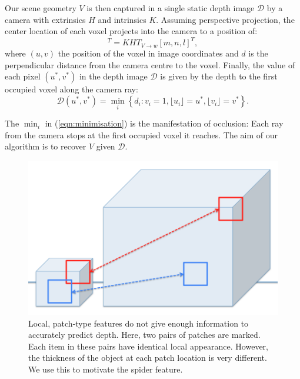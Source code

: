\documentclass[10pt,twocolumn,letterpaper]{article}
\newcommand{\rgbdimage}{\mathcal{D}}
\newcommand{\intrinsics}{K}
\newcommand{\voxelgrid}{V}
\newcommand{\voxidx}{i}
\newcommand{\voxelidxs}{m, n, l}
\newcommand{\trans}{T}
\newcommand{\extrinsics}{H}
\newcommand{\voxelgridtoworld}{\trans_{\voxelgrid \rightarrow w}}
\begin{document}
Our scene geometry $\voxelgrid$ is then captured in a single static depth image $\rgbdimage$ by a camera with extrinsics $\extrinsics$ and intrinsics $\intrinsics$. 
Assuming perspective projection, the center location of each voxel projects into the camera to a position of:
\begin{equation}
[u, v, d]^T = \intrinsics \extrinsics \voxelgridtoworld [\voxelidxs]^T,
\end{equation}
where $(u,v)$ the position of the voxel in image coordinates and $d$ is the  perpendicular distance from the camera centre to the voxel.
Finally, the value of each pixel $(u^*, v^*)$ in the depth image $\rgbdimage$ is given by the depth to the first occupied voxel along the camera ray:
\begin{equation}
\rgbdimage(u^*,v^*) = \min_\voxidx \left\{ d_{\voxidx} : v_{\voxidx} = 1, \lfloor u_{\voxidx} \rfloor = u^*, \lfloor v_{\voxidx} \rfloor = v^* \right\}.
\label{eqn:minimisation}
\end{equation}

The $\min_\voxidx$ in (\ref{eqn:minimisation}) is the manifestation of occlusion: Each ray from the camera stops at the first occupied voxel it reaches.
The aim of our algorithm is to recover $\voxelgrid$ given $\rgbdimage$.




\begin{figure}
  \centering 
  \includegraphics[width=0.9\columnwidth]{patch_sizes.png}
      
  \caption{Local, patch-type features do not give enough information to accurately predict depth. Here, two pairs of patches are marked. Each item in these pairs have identical local appearance. However, the thickness of the object at each patch location is very different. We use this to motivate the spider feature.}
  \label{fig:patch_problems}
\end{figure}
\end{document}
